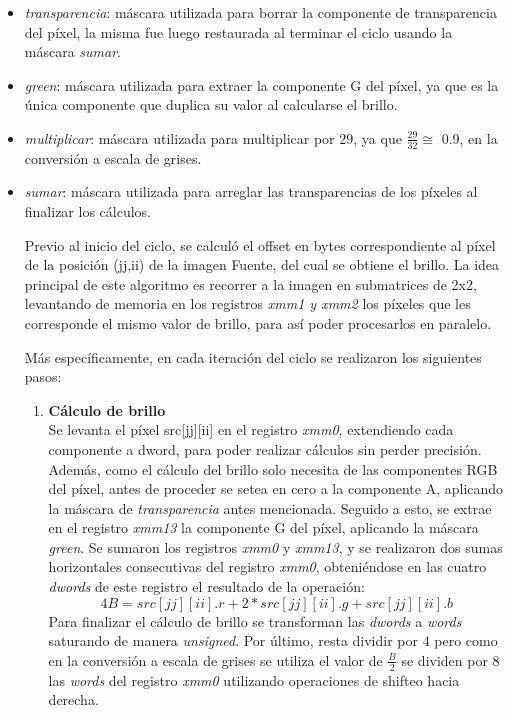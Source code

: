 \documentclass[a4paper]{article}
\begin{document}
\begin{itemize}
	\item \textit{transparencia}: máscara utilizada para borrar la componente de transparencia del píxel, la misma fue luego restaurada al terminar el ciclo usando la máscara \textit{sumar}.
	\item \textit{green}: máscara utilizada para extraer la componente G del píxel, ya que es la única componente que duplica su valor al calcularse el brillo.
	\item \textit{multiplicar}: máscara utilizada para multiplicar por $29$, ya que $\frac{29}{32} \cong $ 0.9, en la conversión a escala de grises.
	\item \textit{sumar}: máscara utilizada para arreglar las transparencias de los píxeles al finalizar los cálculos.
	
 Previo al inicio del ciclo, se calculó el offset en bytes correspondiente al píxel de la posición (jj,ii) de la imagen Fuente, del cual se obtiene el brillo. La idea principal de este algoritmo es recorrer a la imagen en submatrices de 2x2, levantando de memoria en los registros \textit{xmm1 y xmm2}  los píxeles que les corresponde el mismo valor de brillo, para así poder procesarlos en paralelo.
 
 
 Más específicamente, en cada iteración del ciclo se realizaron los siguientes pasos:
 
 \begin{enumerate}
 	\item \textbf{Cálculo de brillo}\\
 	Se levanta el píxel src[jj][ii] en el registro \textit{xmm0}, extendiendo cada componente a dword, para poder realizar cálculos sin perder precisión. Además, como el cálculo del  brillo solo necesita de las componentes RGB del píxel, antes de proceder se setea en cero a la componente A, aplicando la máscara de \textit{transparencia} antes mencionada. Seguido a esto, se extrae en el registro \textit{xmm13} la componente G del píxel, aplicando la máscara \textit{green}. Se sumaron los registros \textit{xmm0} y \textit{xmm13}, y se realizaron dos sumas horizontales consecutivas del registro \textit{xmm0}, obteniéndose en las cuatro \textit{dwords} de este registro el resultado de la operación:
 	\begin{equation}
 	4B = src[jj][ii].r + 2 * src[jj][ii].g + src[jj][ii].b 
 	\end{equation}
 	Para finalizar el cálculo de brillo se transforman las \textit{dwords} a \textit{words} saturando de manera \textit{unsigned}. Por último, resta dividir por $4$ pero como en la conversión a escala de grises se utiliza el valor de $\frac{B}{2}$ se dividen por $8$ las \textit{words} del registro \textit{xmm0} utilizando operaciones de shifteo hacia derecha.
 	

\end{enumerate}
\end{itemize}
\end{document}
